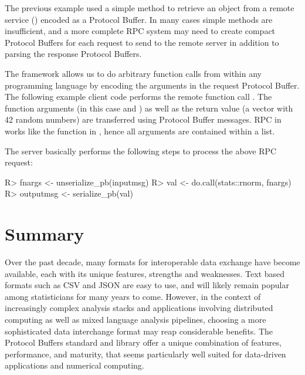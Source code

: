 \documentclass[article]{jss}
\begin{document}
The previous example used a simple  method to retrieve
an  object from a remote service () encoded as a
Protocol Buffer.
In many cases simple  methods are insufficient, and a
more complete RPC system may need to create compact Protocol Buffers
for each request to send to the remote server in addition to parsing
the response Protocol Buffers.

The  framework allows us to do arbitrary  function
calls from within any programming language by encoding the arguments
in the request Protocol Buffer.  The following example 
client code performs the remote function call . The function arguments (in this case  and
) as well as the return value (a vector with 42 random
numbers) are transferred using Protocol Buffer messages. RPC in
 works like the  function in , hence
all arguments are contained within a list.
%
\begin{Schunk}
\end{Schunk}
%
The  server basically performs the following steps to process the above RPC request:
%
\begin{Schunk}
\begin{Sinput}
R> fnargs <- unserialize_pb(inputmsg)
R> val <- do.call(stats::rnorm, fnargs)
R> outputmsg <- serialize_pb(val)
\end{Sinput}
\end{Schunk}

\section{Summary}  
\label{sec:summary}
Over the past decade, many formats for interoperable
data exchange have become available, each with its unique features,
strengths and weaknesses.  
Text based formats such as CSV and JSON are easy to use, and will likely 
remain popular among statisticians for many years to come. However, in the 
context of increasingly complex analysis stacks and applications involving 
distributed computing as well as mixed language analysis pipelines, choosing a more 
sophisticated data interchange format may reap considerable benefits. 
The Protocol Buffers standard and library offer a unique combination of features, 
performance, and maturity, that seems particularly well suited for data-driven 
applications and numerical computing.
\end{document}
